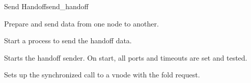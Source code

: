 \begin{actionbox}{Send Handoff}{send_handoff}
	\begin{action}
		 Prepare and send data from one node to another.
		\begin{action}
			 Start a process to send the handoff data.
			\begin{action}
				 Starts the handoff sender.
				On start, all ports and timeouts are set and tested.
				\begin{action}
					 Sets up the synchronized call to a vnode with the fold request.
				\end{action}
			\end{action}
		\end{action}
	\end{action}
\end{actionbox}